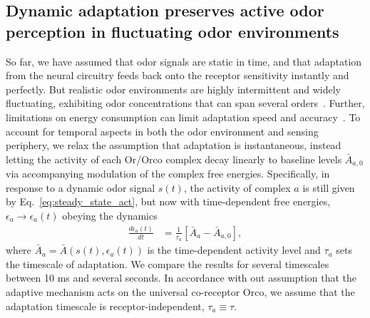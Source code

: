 





\subsection{Dynamic adaptation preserves active odor perception in fluctuating odor environments}
So far, we have assumed that odor signals are static in time, and that adaptation from the neural circuitry feeds back onto the receptor sensitivity instantly and perfectly. But realistic odor environments are highly intermittent and widely fluctuating, exhibiting odor concentrations that can span several orders~\cite{celani}. Further, limitations on energy consumption can limit adaptation speed and accuracy~\cite{ESA}. To account for temporal aspects in both the odor environment and sensing periphery, we relax the assumption that adaptation is instantaneous, instead letting the activity of each Or/Orco complex decay linearly to baseline levels $\bar{A}_{a, 0}$ via accompanying modulation of the complex free energies. Specifically, in response to a dynamic odor signal $s(t)$, the activity of complex $a$ is still given by Eq.~\ref{eq:steady_state_act}, but now with time-dependent free energies, $\epsilon_a \rightarrow \epsilon_a(t)$ obeying the dynamics
\begin{align}
\frac{d\epsilon_a(t)}{dt} &= \frac{1}{\tau_a}\left[\bar{A}_a - \bar {A}_{a,0}\right],
\end{align}
where $\bar {A}_a = \bar{A}(s(t), \epsilon_a(t))$ is the time-dependent activity level and $\tau_a$ sets the timescale of adaptation. We compare the results for several timescales between 10 ms and several seconds. In accordance with out assumption that the adaptive mechanism acts on the universal co-receptor Orco, we assume that the adaptation timescale is receptor-independent, $\tau_a \equiv \tau$. 



